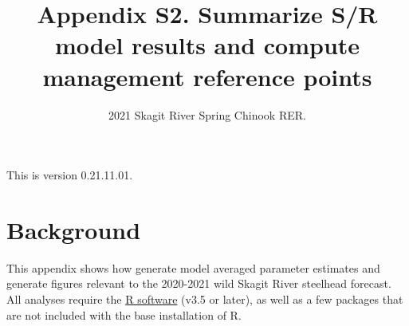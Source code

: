 \documentclass[
  11pt,
]{article}
\title{Appendix S2. Summarize S/R model results and compute management
reference points}
\subtitle{2021 Skagit River Spring Chinook RER.}
\author{}
\date{\vspace{-2.5em}}
\begin{document}
\maketitle

{
\setcounter{tocdepth}{3}
\tableofcontents
}
\vspace{0.2in}

This is version 0.21.11.01.

\hypertarget{background}{%
\section{Background}\label{background}}

This appendix shows how generate model averaged parameter estimates and
generate figures relevant to the 2020-2021 wild Skagit River steelhead
forecast. All analyses require the \href{https://cran.r-project.org/}{R
software} (v3.5 or later), as well as a few packages that are not
included with the base installation of R.
\end{document}
